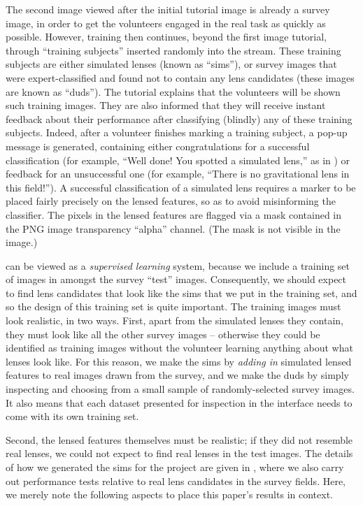 \documentclass[useAMS,usenatbib,a4paper]{mn2e}
\begin{document}
The second image viewed after the initial tutorial image is already a survey
image, in order to get the volunteers engaged in the real task as quickly as
possible. However, training then continues, beyond the first image tutorial,
through ``training subjects'' inserted randomly into the stream.  These
training subjects are either simulated lenses (known as ``sims''), or survey
images that were expert-classified and found not to contain any lens
candidates (these images are known as ``duds''). The tutorial explains that
the volunteers  will be shown such training images. They are also informed
that they will receive instant feedback about their performance after
classifying (blindly) any of these training subjects. Indeed, after a volunteer
finishes marking a training subject, a pop-up
message is generated, containing either congratulations for a successful
classification (for example, ``Well done! You spotted a simulated lens,'' as
in ) or feedback for an unsuccessful one (for
example, ``There is no gravitational lens in this field!''). A successful
classification of a simulated lens requires a marker to be placed fairly
precisely on the lensed features, so as to avoid misinforming the classifier.
The pixels in the lensed features are flagged via a mask contained in the
PNG image transparency ``alpha'' channel. (The mask is not visible in the image.)

\sw can be viewed as a {\it supervised learning} system,
because we include a training set of images in amongst the survey ``test''
images. Consequently,
we should expect to find lens candidates that look like the sims that we put in
the training set, and so the design of this training set is quite important. The
training images must look realistic, in two ways. First, apart from the
simulated lenses they contain, they must look like all the other survey images --
otherwise they could be identified as training images without the volunteer
learning anything about what lenses look like. For this reason, we make the sims
by {\it adding in} simulated lensed features to real images drawn from the
survey, and we make the duds by simply inspecting and choosing from a small
sample of randomly-selected survey images. It also means that each dataset
presented for inspection in the \sw interface needs to come with its own
training set.

Second, the lensed features themselves must be realistic; if they did not
resemble real lenses, we could not expect to find real lenses in the test
images. The details of how we generated the sims for the \cfhtls project are
given in \PaperTwo, where we also carry out performance tests relative to real
lens candidates in the survey fields. Here, we merely note the following
aspects to place this paper's results in context.
\end{document}
